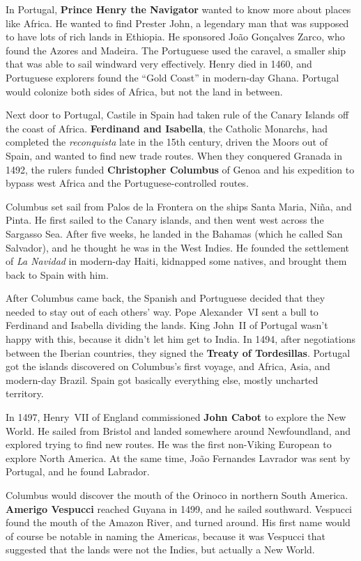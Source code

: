 In Portugal, \textbf{Prince Henry the Navigator} wanted to know more about places like Africa.
He wanted to find Prester John,
a legendary man that was supposed to have lots of rich lands in Ethiopia.
He sponsored Jo\~ao Gon\c{c}alves Zarco, who found the Azores and Madeira.
The Portuguese used the caravel, a smaller ship that was able to sail windward very effectively.
Henry died in 1460, and Portuguese explorers found the ``Gold Coast'' in modern-day Ghana.
Portugal would colonize both sides of Africa, but not the land in between.

Next door to Portugal,
Castile in Spain had taken rule of the Canary Islands off the coast of Africa.
\textbf{Ferdinand and Isabella}, the Catholic Monarchs, had completed the \textit{reconquista}
late in the 15th century, driven the Moors out of Spain, and wanted to find new trade routes.
When they conquered Granada in 1492, the rulers funded \textbf{Christopher Columbus} of Genoa
and his expedition to bypass west Africa and the Portuguese-controlled routes.

Columbus set sail from Palos de la Frontera on the ships Santa Maria, Ni\~na, and Pinta.
He first sailed to the Canary islands, and then went west across the Sargasso Sea.
After five weeks, he landed in the Bahamas (which he called San Salvador),
and he thought he was in the West Indies.
He founded the settlement of \textit{La Navidad} in modern-day Haiti,
kidnapped some natives, and brought them back to Spain with him.

After Columbus came back,
the Spanish and Portuguese decided that they needed to stay out of each others' way.
Pope Alexander~VI sent a bull to Ferdinand and Isabella dividing the lands.
King John~II of Portugal wasn't happy with this, because it didn't let him get to India.
In 1494, after negotiations between the Iberian countries,
they signed the \textbf{Treaty of Tordesillas}.
Portugal got the islands discovered on Columbus's first voyage,
and Africa, Asia, and modern-day Brazil.
Spain got basically everything else, mostly uncharted territory.

In 1497, Henry~VII of England commissioned \textbf{John Cabot} to explore the New World.
He sailed from Bristol and landed somewhere around Newfoundland,
and explored trying to find new routes.
He was the first non-Viking European to explore North America.
At the same time, Jo\~ao Fernandes Lavrador was sent by Portugal, and he found Labrador.

Columbus would discover the mouth of the Orinoco in northern South America.
\textbf{Amerigo Vespucci} reached Guyana in 1499, and he sailed southward.
Vespucci found the mouth of the Amazon River, and turned around.
His first name would of course be notable in naming the Americas,
because it was Vespucci that suggested that the lands were not the Indies, but actually a New World.

